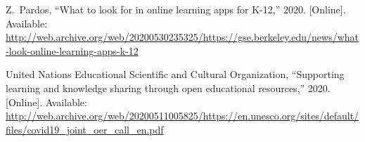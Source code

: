 \documentclass[11pt]{article}
\begin{document}
\begin{thebibliography}{10}
\BIBentryALTinterwordspacing
Z.~Pardos, ``{What to look for in online learning apps for K-12},'' 2020.
  [Online]. Available:
  \url{http://web.archive.org/web/20200530235325/https://gse.berkeley.edu/news/what-look-online-learning-apps-k-12}
\BIBentrySTDinterwordspacing

\BIBentryALTinterwordspacing
{United Nations Educational Scientific and Cultural Organization}, ``Supporting
  learning and knowledge sharing through open educational resources,'' 2020.
  [Online]. Available:
  \url{http://web.archive.org/web/20200511005825/https://en.unesco.org/sites/default/files/covid19_joint_oer_call_en.pdf}
\BIBentrySTDinterwordspacing

\end{thebibliography}
\end{document}
